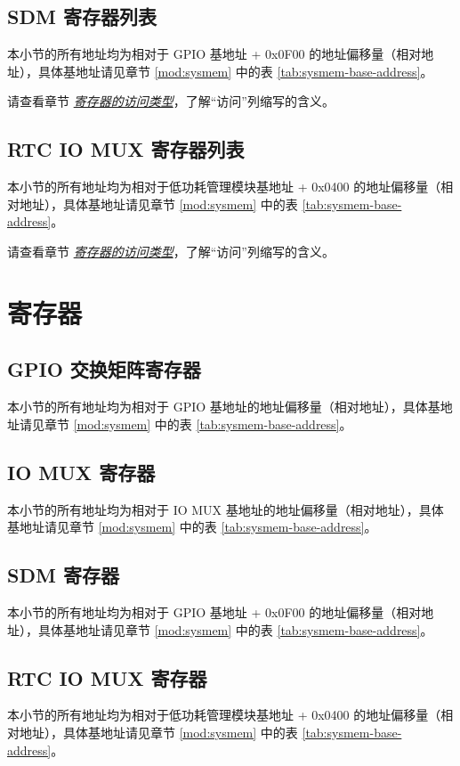 \documentclass[main\_\_CN.tex]{subfiles}
\begin{document}
\subsection{SDM 寄存器列表}
本小节的所有地址均为相对于 GPIO 基地址 + 0x{}0F00 的地址偏移量（相对地址），具体基地址请见章节 \ref{mod:sysmem} \textit{} 中的表 \ref{tab:sysmem-base-address}。


请查看章节 \hyperref[glossary-access-types]{\textit{寄存器的访问类型}}，了解“访问”列缩写的含义。


\subsection{RTC IO MUX 寄存器列表}
本小节的所有地址均为相对于低功耗管理模块基地址 + 0x{}0400 的地址偏移量（相对地址），具体基地址请见章节 \ref{mod:sysmem} \textit{} 中的表 \ref{tab:sysmem-base-address}。


请查看章节 \hyperref[glossary-access-types]{\textit{寄存器的访问类型}}，了解“访问”列缩写的含义。




\section{寄存器}


\subsection{GPIO 交换矩阵寄存器}
本小节的所有地址均为相对于 GPIO 基地址的地址偏移量（相对地址），具体基地址请见章节 \ref{mod:sysmem} \textit{} 中的表 \ref{tab:sysmem-base-address}。


\subsection{IO MUX 寄存器}
本小节的所有地址均为相对于 IO MUX 基地址的地址偏移量（相对地址），具体基地址请见章节 \ref{mod:sysmem} \textit{} 中的表 \ref{tab:sysmem-base-address}。



\subsection{SDM 寄存器}
本小节的所有地址均为相对于 GPIO 基地址 + 0x{}0F00 的地址偏移量（相对地址），具体基地址请见章节 \ref{mod:sysmem} \textit{} 中的表 \ref{tab:sysmem-base-address}。



\subsection{RTC IO MUX 寄存器}
本小节的所有地址均为相对于低功耗管理模块基地址 + 0x{}0400 的地址偏移量（相对地址），具体基地址请见章节 \ref{mod:sysmem} \textit{} 中的表 \ref{tab:sysmem-base-address}。

\end{document}
